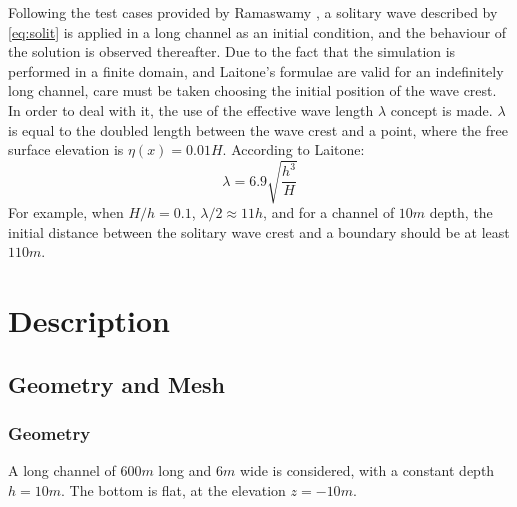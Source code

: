Following the test cases provided by Ramaswamy \cite{Ramaswamy1990}, a solitary wave described by
\eqref{eq:solit} is applied in a long channel as an initial condition, and the
behaviour of the solution is observed thereafter. Due to the fact that the simulation is
performed in a finite domain, and Laitone’s formulae are valid for an indefinitely long
channel, care must be taken choosing the initial position of the wave crest. In order to
deal with it, the use of the effective wave length $\lambda$ concept is made. $\lambda$ is equal to the
doubled length between the wave crest and a point, where the free surface elevation is
$\eta(x) = 0.01H$. According to Laitone:
\begin{equation}
\lambda = 6.9\sqrt{\dfrac{h^3}{H}}
\end{equation}
For example, when $H/h = 0.1$, $\lambda/2 \approx 11h$, and for a channel of $10 m$ depth, the initial
distance between the solitary wave crest and a boundary should be at least $110 m$.

\section{Description}
%
%
%
\subsection{Geometry and Mesh}

\subsubsection{Geometry}
A long channel of $600 m$ long and $6 m$ wide is considered, with a constant depth $h = 10 m$.
The bottom is flat, at the elevation $z = -10m$.

